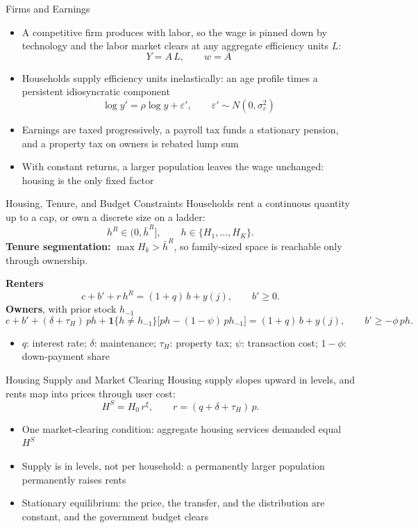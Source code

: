 \documentclass[11pt,aspectratio=169]{beamer}
\begin{document}
\begin{frame}{Firms and Earnings}
\begin{itemize}
  \item A competitive firm produces with labor, so the wage is pinned down by technology and the labor market clears at any aggregate efficiency units $L$:
  \[
  Y = A\,L, \qquad w = A
  \]
  \item Households supply efficiency units inelastically: an age profile times a persistent idiosyncratic component
  \[
  \log y' = \rho \log y + \varepsilon',
  \qquad \varepsilon' \sim N(0,\sigma_\varepsilon^2)
  \]
  \item Earnings are taxed progressively, a payroll tax funds a stationary pension, and a property tax on owners is rebated lump sum
  \item With constant returns, a larger population leaves the wage unchanged: housing is the only fixed factor
\end{itemize}
\end{frame}

\begin{frame}{Housing, Tenure, and Budget Constraints}
\small
\setlength{\abovedisplayskip}{3pt}\setlength{\belowdisplayskip}{3pt}
Households rent a continuous quantity up to a cap, or own a discrete size on a ladder:
\[
h^R \in (0, \bar h^R], \qquad h \in \{H_1,\dots,H_K\}.
\]
\textbf{Tenure segmentation:} $\max H_k > \bar h^R$, so family-sized space is reachable only through ownership.

\smallskip
\textbf{Renters}
\[
c + b' + r\,h^R = (1+q)\,b + y(j),
\qquad b' \ge 0 .
\]
\textbf{Owners}, with prior stock $h_{-1}$
\[
c + b' + (\delta+\tau_H)\,p h
+ \mathbf{1}\{h \ne h_{-1}\}\big[p h - (1-\psi)\,p h_{-1}\big]
= (1+q)\,b + y(j),
\qquad b' \ge -\phi\, p h .
\]
\begin{itemize}
  \item $q$: interest rate; $\delta$: maintenance; $\tau_H$: property tax; $\psi$: transaction cost; $1-\phi$: down-payment share
\end{itemize}
\end{frame}

\begin{frame}{Housing Supply and Market Clearing}
Housing supply slopes upward in levels, and rents map into prices through user cost:
\[
H^S = H_0\,r^{\xi},
\qquad
r = (q+\delta+\tau_H)\,p .
\]
\begin{itemize}
  \item One market-clearing condition: aggregate housing services demanded equal $H^S$
  \item Supply is in levels, not per household: a permanently larger population permanently raises rents
  \item Stationary equilibrium: the price, the transfer, and the distribution are constant, and the government budget clears
\end{itemize}
\end{frame}
\end{document}
